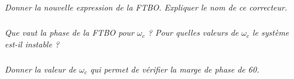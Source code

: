 \documentclass[10pt,fleqn]{article} %
\begin{document}
\begin{multicols}{2}
\subparagraph{}
\textit{Donner la nouvelle expression de la FTBO. Expliquer le nom de ce correcteur.}
\ifprof
\begin{corrige}
\end{corrige}
\else
\fi

\subparagraph{}
\textit{Que vaut la phase de la FTBO pour $\omega_c$ ? Pour quelles valeurs de $\omega_c$  le système est-il instable ?}
\ifprof
\begin{corrige}
\end{corrige}
\else
\fi

\subparagraph{}
\textit{Donner la valeur de $\omega_c$  qui permet de vérifier la marge de phase de 60\degres.}
\ifprof
\begin{corrige}
\end{corrige}
\else
\fi


\end{multicols}
\end{document}
